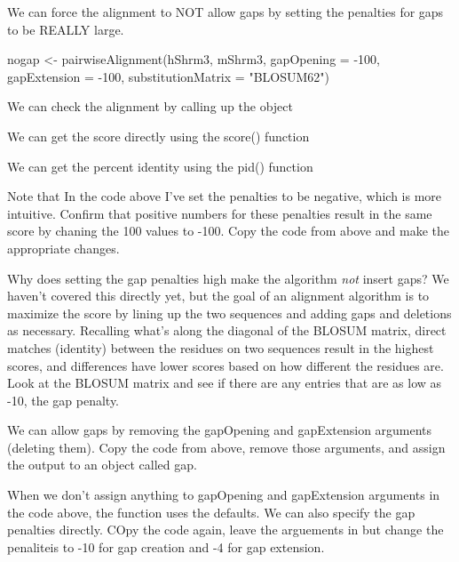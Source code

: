 \documentclass[
]{book}
\newenvironment{Shaded}{\begin{snugshade}}{\end{snugshade}}
\newcommand{\AttributeTok}[1]{\textcolor[rgb]{0.77,0.63,0.00}{#1}}
\newcommand{\DecValTok}[1]{\textcolor[rgb]{0.00,0.00,0.81}{#1}}
\newcommand{\FunctionTok}[1]{\textcolor[rgb]{0.00,0.00,0.00}{#1}}
\newcommand{\NormalTok}[1]{#1}
\newcommand{\OtherTok}[1]{\textcolor[rgb]{0.56,0.35,0.01}{#1}}
\newcommand{\SpecialCharTok}[1]{\textcolor[rgb]{0.00,0.00,0.00}{#1}}
\newcommand{\StringTok}[1]{\textcolor[rgb]{0.31,0.60,0.02}{#1}}
\begin{document}
We can force the alignment to NOT allow gaps by setting the penalties for gaps to be REALLY large.

\begin{Shaded}
\begin{Highlighting}[]
\NormalTok{nogap }\OtherTok{\textless{}{-}} \FunctionTok{pairwiseAlignment}\NormalTok{(hShrm3,}
\NormalTok{                  mShrm3,}
                  \AttributeTok{gapOpening =} \SpecialCharTok{{-}}\DecValTok{100}\NormalTok{,}
                  \AttributeTok{gapExtension =} \SpecialCharTok{{-}}\DecValTok{100}\NormalTok{,}
                  \AttributeTok{substitutionMatrix =} \StringTok{"BLOSUM62"}\NormalTok{)}
\end{Highlighting}
\end{Shaded}

We can check the alignment by calling up the object

We can get the score directly using the score() function

We can get the percent identity using the pid() function

Note that In the code above I've set the penalties to be negative, which is more intuitive. Confirm that positive numbers for these penalties result in the same score by chaning the 100 values to -100. Copy the code from above and make the appropriate changes.

Why does setting the gap penalties high make the algorithm \emph{not} insert gaps? We haven't covered this directly yet, but the goal of an alignment algorithm is to maximize the score by lining up the two sequences and adding gaps and deletions as necessary. Recalling what's along the diagonal of the BLOSUM matrix, direct matches (identity) between the residues on two sequences result in the highest scores, and differences have lower scores based on how different the residues are. Look at the BLOSUM matrix and see if there are any entries that are as low as -10, the gap penalty.

We can allow gaps by removing the gapOpening and gapExtension arguments (deleting them). Copy the code from above, remove those arguments, and assign the output to an object called gap.

When we don't assign anything to gapOpening and gapExtension arguments in the code above, the function uses the defaults. We can also specify the gap penalties directly. COpy the code again, leave the arguements in but change the penaliteis to -10 for gap creation and -4 for gap extension.
\end{document}
